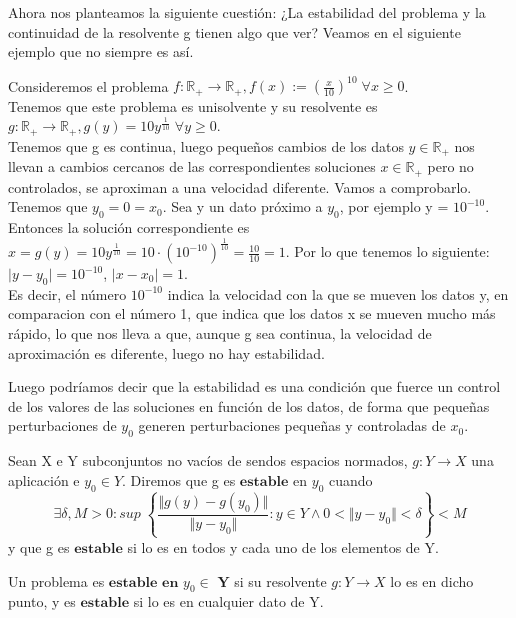 Ahora nos planteamos la siguiente cuestión: ¿La estabilidad del problema y la continuidad de la resolvente g tienen algo que ver? Veamos en el siguiente ejemplo que no siempre es así.

\begin{ejemplo}
Consideremos el problema $f : \mathbb{R}_+ \rightarrow \mathbb{R}_+, f(x) := \left( \frac{x}{10} \right) ^10 \; \forall x \geq 0$.\\
Tenemos que este problema es unisolvente y su resolvente es $g : \mathbb{R}_+ \rightarrow \mathbb{R}_+, g(y) = 10y^{\frac{1}{10}} \; \forall y \geq 0$.\\
Tenemos que g es continua, luego pequeños cambios de los datos $y \in \mathbb{R}_+$ nos llevan a cambios cercanos de las correspondientes soluciones $x \in \mathbb{R}_+$ pero no controlados, se aproximan a una velocidad diferente. Vamos a comprobarlo.\\
Tenemos que $y_0 = 0 = x_0$. Sea y un dato próximo a $y_0$, por ejemplo y = $10^{-10}$. Entonces la solución correspondiente es $x = g(y) = 10y^{\frac{1}{10}} = 10 \cdot \left( 10^{-10} \right) ^{\frac{1}{10}} = \frac{10}{10} = 1$. Por lo que tenemos lo siguiente:\\
$\vert y - y_0 \vert = 10^{-10}$, $\vert x - x_0 \vert = 1$.\\
Es decir, el número $10^{-10}$ indica la velocidad con la que se mueven los datos y, en comparacion con el número 1, que indica que los datos x se mueven mucho más rápido, lo que nos lleva a que, aunque g sea continua, la velocidad de aproximación es diferente, luego no hay estabilidad.
\end{ejemplo}

Luego podríamos decir que la estabilidad es una condición que fuerce un control de los valores de las soluciones en función de los datos, de forma que pequeñas perturbaciones de $y_0$ generen perturbaciones pequeñas y controladas de $x_0$.

\begin{ndef}
Sean X e Y subconjuntos no vacíos de sendos espacios normados, $g : Y \rightarrow X$ una aplicación e $y_0 \in Y$. Diremos que g es $\textbf{estable}$ en $y_0$ cuando
 \[ \exists \delta , M > 0 : sup \; \left\lbrace \frac{ \Vert g(y) - g(y_0) \Vert }{ \Vert y - y_0 \Vert } : y \in Y \wedge 0 < \Vert y - y_0 \Vert < \delta \right\rbrace < M \]
y que g es $\textbf{estable}$ si lo es en todos y cada uno de los elementos de Y.
\end{ndef}

\begin{ndef}
Un problema es $\textbf{estable en $y_0 \in$ Y}$ si su resolvente $g : Y \rightarrow X$ lo es en dicho punto, y es $\textbf{estable}$ si lo es en cualquier dato de Y.
\end{ndef}

